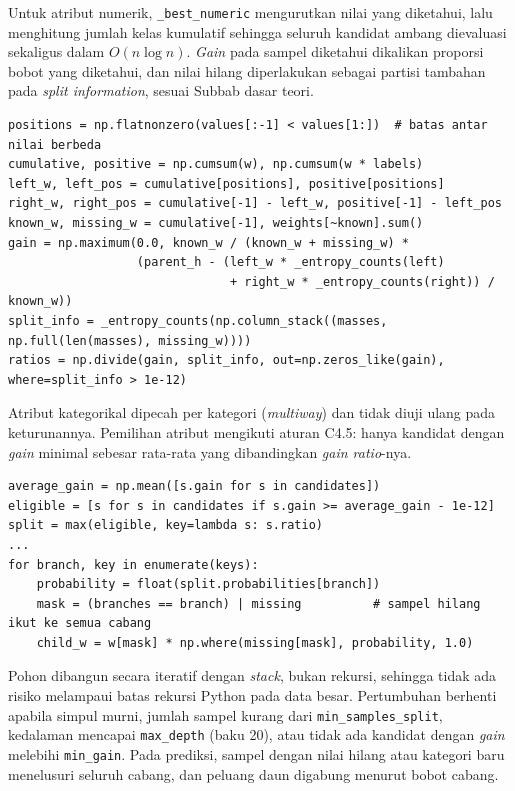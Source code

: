 Untuk atribut numerik, \texttt{\_best\_numeric} mengurutkan nilai yang diketahui, lalu menghitung jumlah kelas kumulatif sehingga seluruh kandidat ambang dievaluasi sekaligus dalam $O(n\log n)$. \textit{Gain} pada sampel diketahui dikalikan proporsi bobot yang diketahui, dan nilai hilang diperlakukan sebagai partisi tambahan pada \textit{split information}, sesuai Subbab dasar teori.

\begin{lstlisting}[emph={_best_numeric},caption={Evaluasi seluruh ambang numerik secara kumulatif (\texttt{src/decision\_tree.py}, diringkas)},label={lst:dtl-numeric}]
positions = np.flatnonzero(values[:-1] < values[1:])  # batas antar nilai berbeda
cumulative, positive = np.cumsum(w), np.cumsum(w * labels)
left_w, left_pos = cumulative[positions], positive[positions]
right_w, right_pos = cumulative[-1] - left_w, positive[-1] - left_pos
known_w, missing_w = cumulative[-1], weights[~known].sum()
gain = np.maximum(0.0, known_w / (known_w + missing_w) *
                  (parent_h - (left_w * _entropy_counts(left)
                               + right_w * _entropy_counts(right)) / known_w))
split_info = _entropy_counts(np.column_stack((masses, np.full(len(masses), missing_w))))
ratios = np.divide(gain, split_info, out=np.zeros_like(gain), where=split_info > 1e-12)
\end{lstlisting}

Atribut kategorikal dipecah per kategori (\textit{multiway}) dan tidak diuji ulang pada keturunannya. Pemilihan atribut mengikuti aturan C4.5: hanya kandidat dengan \textit{gain} minimal sebesar rata-rata yang dibandingkan \textit{gain ratio}-nya.

\begin{lstlisting}[caption={Pemilihan split dan pembagian bobot pecahan (\texttt{src/decision\_tree.py}, diringkas)},label={lst:dtl-split}]
average_gain = np.mean([s.gain for s in candidates])
eligible = [s for s in candidates if s.gain >= average_gain - 1e-12]
split = max(eligible, key=lambda s: s.ratio)
...
for branch, key in enumerate(keys):
    probability = float(split.probabilities[branch])
    mask = (branches == branch) | missing          # sampel hilang ikut ke semua cabang
    child_w = w[mask] * np.where(missing[mask], probability, 1.0)
\end{lstlisting}

Pohon dibangun secara iteratif dengan \textit{stack}, bukan rekursi, sehingga tidak ada risiko melampaui batas rekursi Python pada data besar. Pertumbuhan berhenti apabila simpul murni, jumlah sampel kurang dari \texttt{min\_samples\_split}, kedalaman mencapai \texttt{max\_depth} (baku 20), atau tidak ada kandidat dengan \textit{gain} melebihi \texttt{min\_gain}. Pada prediksi, sampel dengan nilai hilang atau kategori baru menelusuri seluruh cabang, dan peluang daun digabung menurut bobot cabang.


